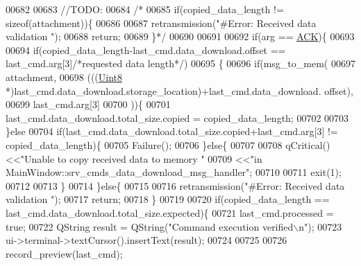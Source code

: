 \begin{DoxyCode}
{{{{{{{{{{{{{{{{{{{{00682 
00683             \textcolor{comment}{//TODO:}
00684            \textcolor{comment}{/*}
00685 \textcolor{comment}{           if(copied\_data\_length != sizeof(attachment))\{}
00686 \textcolor{comment}{}
00687 \textcolor{comment}{               retransmission("#Error: Received data  validation ");}
00688 \textcolor{comment}{               return;}
00689 \textcolor{comment}{           \}*/}
00690 
00691 
00692            \textcolor{keywordflow}{if}(arg == \hyperlink{a00090_a6f6489887e08bff4887d0bc5dcf214d8}{ACK})\{
00693 
00694                \textcolor{keywordflow}{if}(copied\_data\_length-last\_cmd.data\_download.offset == last\_cmd.arg[3]\textcolor{comment}{/*requested data
       length*/})
00695                \{
00696                \textcolor{keywordflow}{if}(msg\_to\_mem(
00697                       attachment,
00698                       (((\hyperlink{a00004_a979e3e23b9a449e69ab6a8a83b6042f8}{Uint8} *)last\_cmd.data\_download.storage\_location)+last\_cmd.data\_download.
      offset),
00699                       last\_cmd.arg[3]
00700                           ))\{
00701                    last\_cmd.data\_download.total\_size.copied = copied\_data\_length;
00702 
00703                   \}\textcolor{keywordflow}{else}
00704                   \textcolor{keywordflow}{if}(last\_cmd.data\_download.total\_size.copied+last\_cmd.arg[3] != copied\_data\_length)\{
00705                     Failure();
00706                   \}\textcolor{keywordflow}{else}\{
00707                    
00708                    qCritical() <<\textcolor{stringliteral}{"Unable to copy received data to memory "}
00709                                <<\textcolor{stringliteral}{"in MainWindow::srv\_cmds\_data\_download\_msg\_handler"};
00710                 
00711                    exit(1);
00712                    
00713                   \}
00714                \}\textcolor{keywordflow}{else}\{
00715                    
00716                   retransmission(\textcolor{stringliteral}{"#Error: Received data  validation "});
00717                   \textcolor{keywordflow}{return};
00718                \}
00719                
00720                \textcolor{keywordflow}{if}(copied\_data\_length == last\_cmd.data\_download.total\_size.expected)\{
00721                    last\_cmd.processed = \textcolor{keyword}{true};
00722                    QString result =  QString(\textcolor{stringliteral}{"Command execution verified\(\backslash\)n"});
00723                    ui->terminal->textCursor().insertText(result);
00724 
00725                    
00726                    record\_preview(last\_cmd);
}}}}}}}}}}}}}}}}}}}}
\end{DoxyCode}
